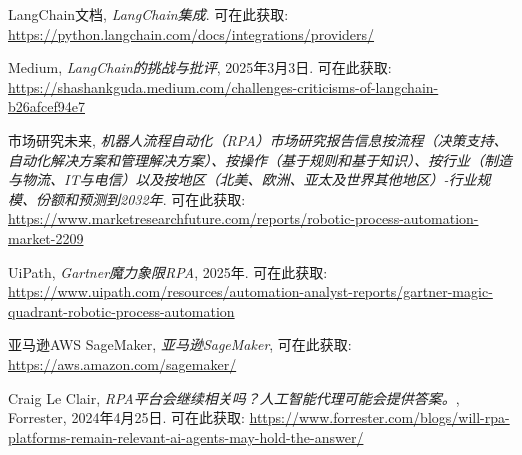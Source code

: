 \documentclass[11pt, a4paper, oneside]{article}
\begin{document}
\begin{thebibliography}{99}
    LangChain文档, \textit{LangChain集成}. 可在此获取: \url{https://python.langchain.com/docs/integrations/providers/}

    Medium, \textit{LangChain的挑战与批评}, 2025年3月3日. 可在此获取: \url{https://shashankguda.medium.com/challenges-criticisms-of-langchain-b26afcef94e7}

    市场研究未来, \textit{机器人流程自动化（RPA）市场研究报告信息按流程（决策支持、自动化解决方案和管理解决方案）、按操作（基于规则和基于知识）、按行业（制造与物流、IT与电信）以及按地区（北美、欧洲、亚太及世界其他地区）-行业规模、份额和预测到2032年}. 可在此获取: \url{https://www.marketresearchfuture.com/reports/robotic-process-automation-market-2209}

    UiPath, \textit{Gartner魔力象限RPA}, 2025年. 可在此获取: \url{https://www.uipath.com/resources/automation-analyst-reports/gartner-magic-quadrant-robotic-process-automation}

    亚马逊AWS SageMaker, \textit{亚马逊SageMaker}, 可在此获取: \url{https://aws.amazon.com/sagemaker/}

    Craig Le Clair, \textit{RPA平台会继续相关吗？人工智能代理可能会提供答案。}, Forrester, 2024年4月25日. 可在此获取: \url{https://www.forrester.com/blogs/will-rpa-platforms-remain-relevant-ai-agents-may-hold-the-answer/} 

\end{thebibliography}
\end{document}
